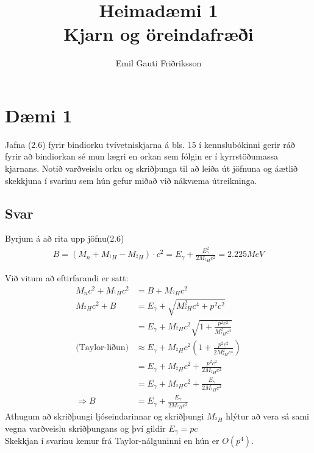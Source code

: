 \documentclass[11pt]{article}
\title{\vspace{-3cm}Heimadæmi 1\\ \vspace{0.4cm} \large Kjarn og öreindafræði \vspace{-0.3cm}}
\author{Emil Gauti Friðriksson}
\begin{document}
\maketitle
\section*{Dæmi 1}
Jafna (2.6) fyrir bindiorku tvívetniskjarna á bls. 15 í kennslubókinni gerir ráð fyrir að bindiorkan sé mun lægri en orkan sem fólgin er í kyrrstöðumassa kjarnans. Notið varðveislu orku og skriðþunga til að leiða út jöfnuna og áætlið skekkjuna í svarinu sem hún gefur miðað við nákvæma útreikninga.

\subsection*{Svar}
Byrjum á að rita upp jöfnu(2.6)
\begin{align*}
    B = (M_n + M_{^1H}-M_{^2H})\cdot c^2 = E_\gamma + \frac{E_\gamma ^2}{2M_{^2H}c^2} = 2.225 MeV
\end{align*}

\noindent Við vitum að eftirfarandi er satt:
\begin{align*}
    M_n c^2 + M_{^1H} c^2   &= B + M_{^2H}c^2\\
    M_{^2H}c^2 + B          &= E_\gamma + \sqrt{M_{^2H}^2c^4 + p^2c^2}\\
                            &= E_\gamma + M_{^2H}c^2\sqrt{1 + \frac{p^2c^2}{M_{^2H}^2c^4}} \\
\text{(Taylor-liðun)}       &\approx E_\gamma + M_{^2H}c^2\left(1 + \frac{p^2c^2}{2M_{^2H}^2c^4}\right)\\
                            &=E_\gamma +  M_{^2H}c^2 + \frac{p^2c^2}{2M_{^2H}c^2}\\
                            &=E_\gamma +  M_{^2H}c^2 + \frac{E_\gamma}{2M_{^2H}c^2}\\
\Rightarrow             B   &=E_\gamma + \frac{E_\gamma}{2M_{^2H}c^2}
\end{align*}
Athugum að skriðþungi ljóseindarinnar og skriðþungi $M_{^2H}$ hlýtur að vera sá sami vegna varðveislu skriðþungans og því gildir $E_\gamma = pc$\\
Skekkjan í svarinu kemur frá Taylor-nálguninni en hún er $O(p^4)$.
\end{document}
